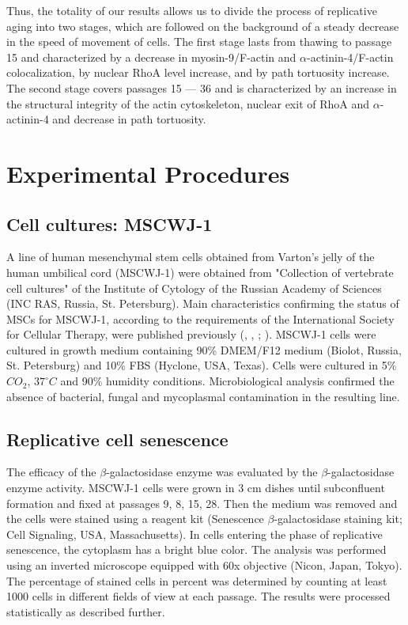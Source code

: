 \documentclass[alpha-refs]{wiley-article}
\begin{document}
Thus, the totality of our results allows us to divide the process of replicative aging into two stages, which are followed on the background of a steady decrease in the speed of movement of cells.
The first stage lasts from thawing to passage 15 and characterized by a decrease in  myosin-9/F-actin and $\alpha$-actinin-4/F-actin colocalization, by nuclear RhoA level increase, and by path tortuosity increase.
The second stage covers passages 15 --- 36 and is characterized by an increase in the structural integrity of the actin cytoskeleton, nuclear exit of RhoA and $\alpha$-actinin-4 and decrease in path tortuosity.

\section{Experimental Procedures}

\subsection{Cell cultures: MSCWJ-1}

A line of human mesenchymal stem cells obtained from Varton's jelly of the human umbilical cord (MSCWJ-1) were obtained from "Collection of vertebrate cell cultures" of the Institute of Cytology of the Russian Academy of Sciences (INC RAS, Russia, St. Petersburg).
Main characteristics confirming the status of MSCs for MSCWJ-1, according to the requirements of the International Society for Cellular Therapy, were published previously (\cite{krylova2017derivation}, \cite{koltsova2018dynamics}, \cite{dominici2006minimal}; \cite{sensebe2010mesenchymal}).
MSCWJ-1 cells were cultured in growth medium containing 90\% DMEM/F12 medium (Biolot, Russia, St. Petersburg) and 10\% FBS (Hyclone, USA, Texas).
Cells were cultured in 5\% $CO_2$, $37^{\circ}  C$ and 90\% humidity conditions.
Microbiological analysis confirmed the absence of bacterial, fungal and mycoplasmal contamination in the resulting line.

\subsection{Replicative cell senescence}

The efficacy of the $\beta$-galactosidase enzyme was evaluated by the $\beta$-galactosidase enzyme activity.
MSCWJ-1 cells were grown in 3 cm dishes until subconfluent formation and fixed at passages 9, 8, 15, 28.
Then the medium was removed and the cells were stained using a reagent kit (Senescence $\beta$-galactosidase staining kit; Cell Signaling, USA, Massachusetts).
In cells entering the phase of replicative senescence, the cytoplasm has a bright blue color.
The analysis was performed using an inverted microscope equipped with 60x objective (Nicon, Japan, Tokyo).
The percentage of stained cells in percent was determined by counting at least 1000 cells in different fields of view at each passage.
The results were processed statistically as described further.
\end{document}
